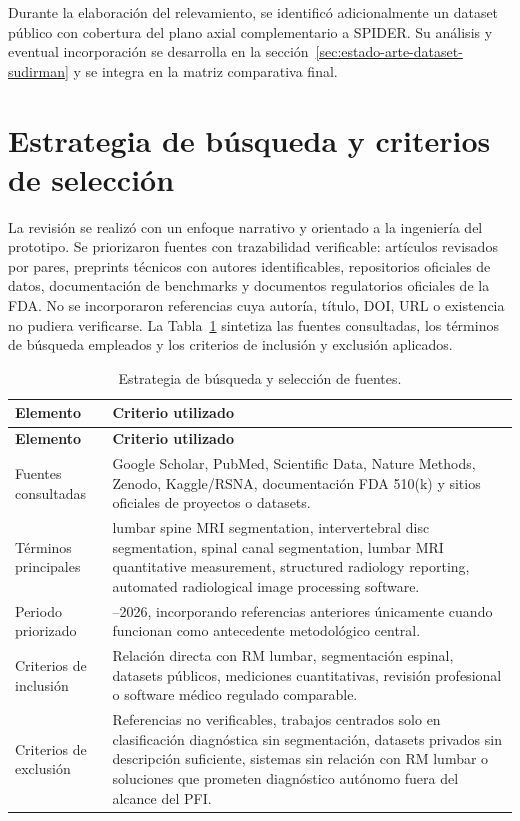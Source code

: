 Durante la elaboración del relevamiento, se identificó adicionalmente un dataset público con cobertura del plano axial complementario a SPIDER. Su análisis y eventual incorporación se desarrolla en la sección~\ref{sec:estado-arte-dataset-sudirman} y se integra en la matriz comparativa final.

\section{Estrategia de búsqueda y criterios de selección}

La revisión se realizó con un enfoque narrativo y orientado a la ingeniería del prototipo. Se priorizaron fuentes con trazabilidad verificable: artículos revisados por pares, preprints técnicos con autores identificables, repositorios oficiales de datos, documentación de benchmarks y documentos regulatorios oficiales de la FDA. No se incorporaron referencias cuya autoría, título, DOI, URL o existencia no pudiera verificarse. La Tabla~\ref{tab:estado-arte-busqueda} sintetiza las fuentes consultadas, los términos de búsqueda empleados y los criterios de inclusión y exclusión aplicados.

\begingroup
\small
\sloppy
\setlength{\emergencystretch}{3em}
\setlength{\tabcolsep}{3pt}
\setlength{\LTleft}{0pt}
\setlength{\LTright}{0pt}
\renewcommand{\arraystretch}{1.15}
\begin{longtable}{|>{\raggedright\arraybackslash}p{}|>{\raggedright\arraybackslash}p{}|}
\caption{Estrategia de búsqueda y selección de fuentes.}
\label{tab:estado-arte-busqueda}\\
\hline
\textbf{Elemento} & \textbf{Criterio utilizado} \\
\hline
\endfirsthead
\hline
\textbf{Elemento} & \textbf{Criterio utilizado} \\
\hline
\endhead
Fuentes consultadas & Google Scholar, PubMed, Scientific Data, Nature Methods, Zenodo, Kaggle/RSNA, documentación FDA 510(k) y sitios oficiales de proyectos o datasets. \\
\hline
Términos principales & lumbar spine MRI segmentation, intervertebral disc segmentation, spinal canal segmentation, lumbar MRI quantitative measurement, structured radiology reporting, automated radiological image processing software. \\
\hline
Periodo priorizado & 2020–2026, incorporando referencias anteriores únicamente cuando funcionan como antecedente metodológico central. \\
\hline
Criterios de inclusión & Relación directa con RM lumbar, segmentación espinal, datasets públicos, mediciones cuantitativas, revisión profesional o software médico regulado comparable. \\
\hline
Criterios de exclusión & Referencias no verificables, trabajos centrados solo en clasificación diagnóstica sin segmentación, datasets privados sin descripción suficiente, sistemas sin relación con RM lumbar o soluciones que prometen diagnóstico autónomo fuera del alcance del PFI. \\
\hline
\end{longtable}
\endgroup

